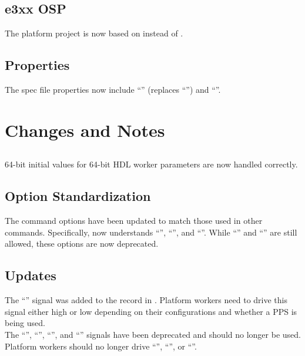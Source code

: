\subsection{e3xx OSP}
\label{sec:21_e3xx}
The  platform project is now based on  instead of .

\subsection{ Properties}
\label{sec:21_tsprop}
The  spec file properties now include ``'' (replaces ``'') and ``''.

\section{Changes and Notes}

\subsection{}
\label{sec:21_ocpigen}
64-bit initial values for 64-bit HDL worker parameters are now handled correctly.

\subsection{ Option Standardization}
\label{sec:21_ocpiremote}
The  command options have been updated to match those used in other commands.  Specifically,  now understands ``'', ``'', and ``''.  While ``'' and ``'' are still allowed, these options are now deprecated.

\subsection{ Updates}
\label{sec:21_platpkg}
The ``'' signal was added to the  record in .  Platform workers need to drive this signal either high or low depending on their configurations and whether a PPS is being used.\\

The ``'', ``'', ``'', and ``'' signals have been deprecated and should no longer be used.  Platform workers should no longer drive ``'', ``'', or ``''.

